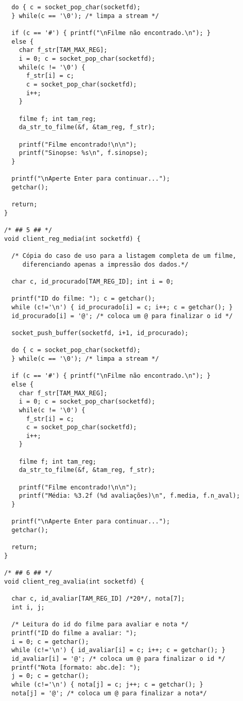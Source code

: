 \documentclass[11pt,twoside]{article}
\begin{document}
\begin{verbatim}
  do { c = socket_pop_char(socketfd);
  } while(c == '\0'); /* limpa a stream */
  
  if (c == '#') { printf("\nFilme não encontrado.\n"); }
  else {
    char f_str[TAM_MAX_REG];
    i = 0; c = socket_pop_char(socketfd);
    while(c != '\0') { 
      f_str[i] = c; 
      c = socket_pop_char(socketfd);
      i++;
    }

    filme f; int tam_reg;
    da_str_to_filme(&f, &tam_reg, f_str);

    printf("Filme encontrado!\n\n");
    printf("Sinopse: %s\n", f.sinopse);
  }

  printf("\nAperte Enter para continuar...");
  getchar();

  return;
}

/* ## 5 ## */
void client_reg_media(int socketfd) {

  /* Cópia do caso de uso para a listagem completa de um filme, 
     diferenciando apenas a impressão dos dados.*/

  char c, id_procurado[TAM_REG_ID]; int i = 0;

  printf("ID do filme: "); c = getchar();
  while (c!='\n') { id_procurado[i] = c; i++; c = getchar(); }
  id_procurado[i] = '@'; /* coloca um @ para finalizar o id */

  socket_push_buffer(socketfd, i+1, id_procurado);

  do { c = socket_pop_char(socketfd);
  } while(c == '\0'); /* limpa a stream */
  
  if (c == '#') { printf("\nFilme não encontrado.\n"); }
  else {
    char f_str[TAM_MAX_REG];
    i = 0; c = socket_pop_char(socketfd);
    while(c != '\0') { 
      f_str[i] = c; 
      c = socket_pop_char(socketfd);
      i++;
    }

    filme f; int tam_reg;
    da_str_to_filme(&f, &tam_reg, f_str);

    printf("Filme encontrado!\n\n");
    printf("Média: %3.2f (%d avaliações)\n", f.media, f.n_aval);
  }

  printf("\nAperte Enter para continuar...");
  getchar();

  return;
}

/* ## 6 ## */
void client_reg_avalia(int socketfd) {

  char c, id_avaliar[TAM_REG_ID] /*20*/, nota[7];
  int i, j;

  /* Leitura do id do filme para avaliar e nota */
  printf("ID do filme a avaliar: ");
  i = 0; c = getchar();
  while (c!='\n') { id_avaliar[i] = c; i++; c = getchar(); }
  id_avaliar[i] = '@'; /* coloca um @ para finalizar o id */
  printf("Nota [formato: abc.de]: ");
  j = 0; c = getchar();
  while (c!='\n') { nota[j] = c; j++; c = getchar(); }
  nota[j] = '@'; /* coloca um @ para finalizar a nota*/


\end{verbatim}
\end{document}
